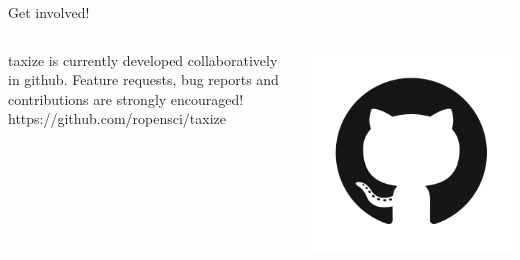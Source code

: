 \documentclass[final,t]{beamer}\usepackage[]{graphicx}\usepackage[]{color}
\begin{document}
\begin{frame}[fragile]
\begin{columns}[t]
\begin{column}{.49\linewidth}
			\begin{block}{Get involved!}
				\begin{columns}[T]
					\begin{column}{.78\linewidth}
						taxize is currently developed collaboratively in github. Feature requests, bug reports and contributions are strongly encouraged! \\[0.5em]
						\huge \Mundus \normalsize \hspace{0.5cm} https://github.com/ropensci/taxize
					\end{column}
					\begin{column}{.2\linewidth}
						\includegraphics[width=0.85\linewidth]{fig/github.png}
					\end{column}
				\end{columns}
			\end{block}
		\end{column}
	\end{columns}
\end{frame}
\end{document}
